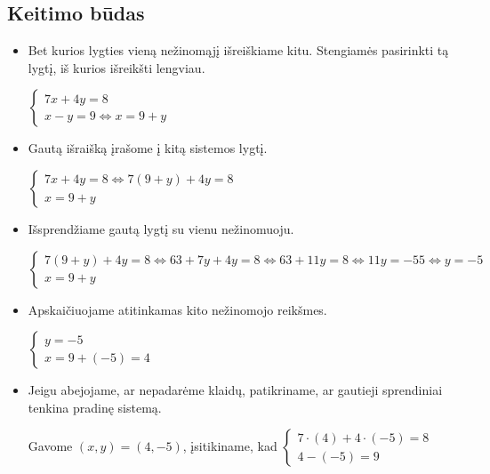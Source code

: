 \documentclass[12pt,a4paper]{report}
\numberwithin{table}{chapter}
\numberwithin{figure}{chapter}
\theoremstyle{definition}
\begin{document}
\subsection*{Keitimo būdas}
\begin{itemize}
\item \label{itm:tsys1} Bet kurios lygties vieną nežinomąjį išreiškiame kitu. Stengiamės pasirinkti tą lygtį, iš kurios išreikšti lengviau.

$\begin{cases}
7x+4y=8 \\
x-y=9  \hyperref[itm: tlyg2]{\Leftrightarrow } x=9+y
\end{cases} $

\item \label{itm:tlyg1} Gautą išraišką įrašome į kitą sistemos lygtį.

$\begin{cases}
7x+4y=8  \Leftrightarrow 7(9+y)+4y=8 \\
x=9+y
\end{cases} $

\item Išsprendžiame gautą lygtį su vienu nežinomuoju.

$\begin{cases}
7(9+y)+4y=8 \hyperref[itm:tlyg2]{\Leftrightarrow }  63+7y+4y=8  \hyperref[itm:tlyg3]{\Leftrightarrow } 63+11y=8 \hyperref[itm:tlyg4]{\Leftrightarrow } 11y=-55  \hyperref[itm:tlyg4]{\Leftrightarrow} y=-5\\
x=9+y
\end{cases} $

\item Apskaičiuojame atitinkamas kito nežinomojo reikšmes.

$\begin{cases}
y=-5\\
x=9+(-5)=4
\end{cases} $
\item Jeigu abejojame, ar nepadarėme klaidų, patikriname, ar gautieji sprendiniai tenkina pradinę sistemą. 

Gavome $(x,y)=(4,-5)$, įsitikiname, kad
$\begin{cases}
7\cdot(4)+4\cdot (-5)=8 \\
4-(-5)=9 
\end{cases} $
\end{itemize}
\end{document}
